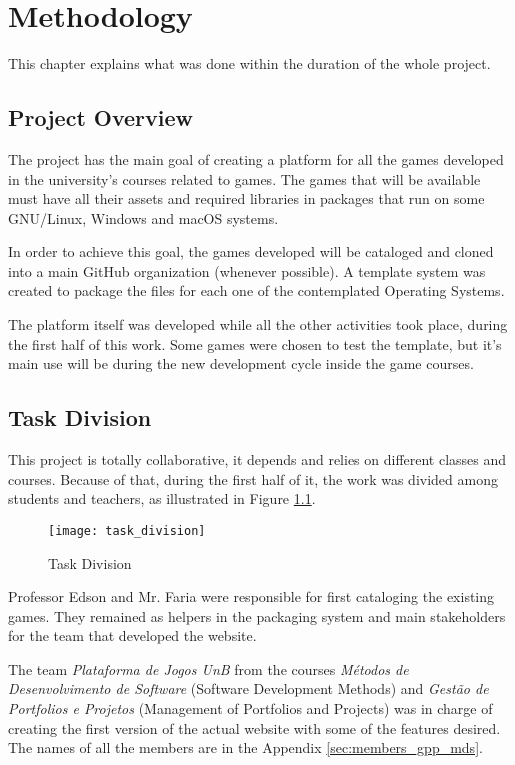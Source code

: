 \chapter{Methodology}
\label{sec:methodology}

This chapter explains what was done within the duration of the whole project.

\section{Project Overview}
\label{sec:project_overview}

The project has the main goal of creating a platform for all the games developed in the university's courses related to games. The games that will be available must have all their assets and required libraries in packages that run on some GNU/Linux, Windows and macOS systems.

In order to achieve this goal, the games developed will be cataloged and cloned into a main GitHub organization (whenever possible). A template system was created to package the files for each one of the contemplated Operating Systems.

The platform itself was developed while all the other activities took place, during the first half of this work. Some games were chosen to test the template, but it's main use will be during the new development cycle inside the game courses.

\section{Task Division}
\label{sec:task_division}

This project is totally collaborative, it depends and relies on different classes and courses. Because of that, during the first half of it, the work was divided among students and teachers, as illustrated in Figure \ref{fig:task_division}.

\begin{figure}[h!]
\centering
\texttt{[image: task\_division]}
\caption{Task Division}
\label{fig:task_division}
\end{figure}

Professor Edson and Mr. Faria were responsible for first cataloging the existing games. They remained as helpers in the packaging system and main stakeholders for the team that developed the website.

The team \textit{Plataforma de Jogos UnB} from the courses \textit{M\'etodos de Desenvolvimento de Software} (Software Development Methods) and \textit{Gest\~ao de Portfolios e Projetos} (Management of Portfolios and Projects) was in charge of creating the first version of the actual website with some of the features desired. The names of all the members are in the Appendix \ref{sec:members_gpp_mds}.

